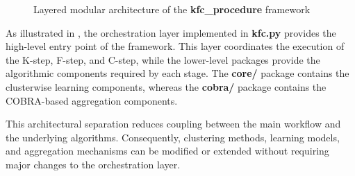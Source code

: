 \begin{figure}[H]
      \centering
      \caption{Layered modular architecture of the \textbf{kfc\_procedure} framework}
      \label{fig:layered-modular-architecture}
\end{figure}

As illustrated in , the orchestration layer implemented in \textbf{kfc.py} provides the high-level entry point of the framework. This layer coordinates the execution of the K-step, F-step, and C-step, while the lower-level packages provide the algorithmic components required by each stage. The \textbf{core/} package contains the clusterwise learning components, whereas the \textbf{cobra/} package contains the COBRA-based aggregation components.

This architectural separation reduces coupling between the main workflow and the underlying algorithms. Consequently, clustering methods, learning models, and aggregation mechanisms can be modified or extended without requiring major changes to the orchestration layer.

